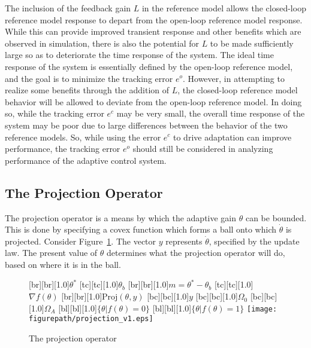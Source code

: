 The inclusion of the feedback gain $L$ in the reference model allows the closed-loop reference model response to depart from the open-loop reference model response.
While this can provide improved transient response and other benefits which are observed in simulation, there is also the potential for $L$ to be made sufficiently large so as to deteriorate the time response of the system.
The ideal time response of the system is essentially defined by the open-loop reference model, and the goal is to minimize the tracking error $e^{o}$.
However, in attempting to realize some benefits through the addition of $L$, the closed-loop reference model behavior will be allowed to deviate from the open-loop reference model.
In doing so, while the tracking error $e^{c}$ may be very small, the overall time response of the system may be poor due to large differences between the behavior of the two reference models.
So, while using the error $e^{c}$ to drive adaptation can improve performance, the tracking error $e^{o}$ should still be considered in analyzing performance of the adaptive control system.

\subsection{The Projection Operator}\label{sec:projection}

The projection operator is a means by which the adaptive gain $\theta$ can be bounded.
This is done by specifying a covex function which forms a ball onto which $\dot{\theta}$ is projected.
Consider Figure~\ref{fig:projection}.
The vector $y$ represents $\dot{\theta}$, specified by the update law.
The present value of $\theta$ determines what the projection operator will do, based on where it is in the ball.

\begin{figure}[H]
  \begin{center}
    [br][br][1.0]{$\theta^{*}$}
    [tc][tc][1.0]{$\theta_{b}$}
    [br][br][1.0]{$m=\theta^{*}-\theta_{b}$}
    [tc][tc][1.0]{$\nabla f(\theta)$}
    [br][br][1.0]{$\text{Proj}(\theta,y)$}
    [bc][bc][1.0]{$y$}
    [bc][bc][1.0]{$\Omega_{0}$}
    [bc][bc][1.0]{$\Omega_{A}$}
    [bl][bl][1.0]{$\{\theta|f(\theta)=0\}$}
    [bl][bl][1.0]{$\{\theta|f(\theta)=1\}$}
    \texttt{[image: \\figurepath/projection\_v1.eps]}
    \caption{The projection operator\label{fig:projection}}
  \end{center}
\end{figure}

